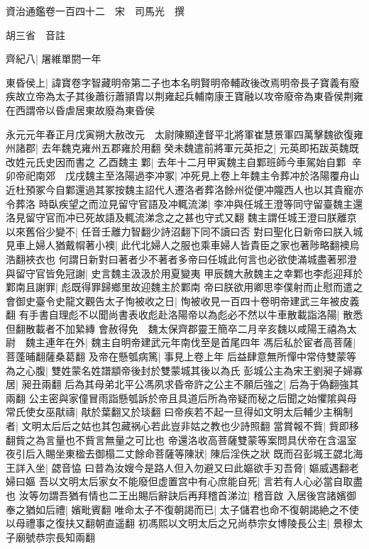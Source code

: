 資治通鑑卷一百四十二　宋　司馬光　撰

胡三省　音註

齊紀八|{
	屠維單閼一年}


東昏侯上|{
	諱寶卷字智藏明帝第二子也本名明賢明帝輔政後改焉明帝長子寶義有廢疾故立帝為太子其後蕭衍蕭頴胄以荆雍起兵輔南康王寶融以攻帝廢帝為東昏侯荆雍在西謂帝以昏虐居東故廢為東昏侯}


永元元年春正月戊寅朔大赦改元　太尉陳顯達督平北將軍崔慧景軍四萬擊魏欲復雍州諸郡|{
	去年魏克雍州五郡雍於用翻}
癸未魏遣前將軍元英拒之|{
	元英即拓跋英魏既改姓元氏史因而書之}
乙酉魏主鄴|{
	去年十二月甲寅魏主自鄴班師今車駕始自鄴}
辛卯帝祀南郊　戊戌魏主至洛陽過李冲冢|{
	冲死見上卷上年魏主令葬冲於洛陽覆舟山近杜預冢今自鄴還過其冢按魏主詔代人遷洛者葬洛餘州從便冲隴西人也以其貴寵亦令葬洛}
時臥疾望之而泣見留守官語及冲輒流涕|{
	李冲與任城王澄等同守留臺魏主還洛見留守官而冲已死故語及輒流涕念之之甚也守式又翻}
魏主謂任城王澄曰朕離京以來舊俗少變不|{
	任音壬離力智翻少詩沼翻下同不讀曰否}
對曰聖化日新帝曰朕入城見車上婦人猶戴㡌著小襖|{
	此代北婦人之服也乘車婦人皆貴臣之家也著陟略翻襖烏浩翻裌衣也}
何謂日新對曰著者少不著者多帝曰任城此何言也必欲使滿城盡著邪澄與留守官皆免冠謝|{
	史言魏主汲汲於用夏變夷}
甲辰魏大赦魏主之幸鄴也李彪迎拜於鄴南且謝罪|{
	彪既得罪歸鄉里故迎魏主於鄴南}
帝曰朕欲用卿思李僕射而止慰而遣之會御史臺令史龍文觀告太子恂被收之日|{
	恂被收見一百四十卷明帝建武三年被皮義翻}
有手書自理彪不以聞尚書表收彪赴洛陽帝以為彪必不然以牛車散載詣洛陽|{
	散悉但翻散載者不加縶縳}
會赦得免　魏太保齊郡靈王簡卒二月辛亥魏以咸陽王禧為太尉　魏主連年在外|{
	魏主自明帝建武元年南伐至是首尾四年}
馮后私於宦者高菩薩|{
	菩蓬晡翻薩桑葛翻}
及帝在懸瓠病篤|{
	事見上卷上年}
后益肆意無所憚中常侍雙蒙等為之心腹|{
	雙姓蒙名姓譜顓帝後封於雙蒙城其後以為氏}
彭城公主為宋王劉昶子婦寡居|{
	昶丑兩翻}
后為其母弟北平公馮夙求昏帝許之公主不願后強之|{
	后為于偽翻強其兩翻}
公主密與家僮冒雨詣懸瓠訴於帝且具道后所為帝疑而秘之后聞之始懼隂與母常氏使女巫猒禱|{
	猒於葉翻又於琰翻}
曰帝疾若不起一旦得如文明太后輔少主稱制者|{
	文明太后后之姑也其包藏祸心若此豈非姑之教也少詩照翻}
當賞報不貲|{
	貲即移翻貲之為言量也不貲言無量之可比也}
帝還洛收高菩薩雙蒙等案問具伏帝在含温室夜引后入賜坐東楹去御榻二丈餘命菩薩等陳狀|{
	陳后淫佚之狀}
既而召彭城王勰北海王詳入坐|{
	勰音恊}
曰昔為汝嫂今是路人但入勿避又曰此嫗欲手刃吾脅|{
	嫗威遇翻老婦曰嫗}
吾以文明太后家女不能廢但虚置宫中有心庶能自死|{
	言若有人心必當自取盡也}
汝等勿謂吾猶有情也二王出賜后辭訣后再拜稽首涕泣|{
	稽音啟}
入居後宫諸嬪御奉之猶如后禮|{
	嬪毗賓翻}
唯命太子不復朝謁而已|{
	太子儲君也命不復朝謁絶之不使以母禮事之復扶又翻朝直遥翻}
初馮熙以文明太后之兄尚恭宗女博陵長公主|{
	景穆太子廟號恭宗長知兩翻}

